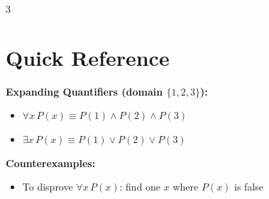 \documentclass[8pt]{article}
\begin{document}
\begin{multicols}{3}
\section*{Quick Reference}
\textbf{Expanding Quantifiers (domain $\{1,2,3\}$):}
\begin{itemize}[nosep]
\item $\forall x\, P(x) \equiv P(1) \land P(2) \land P(3)$
\item $\exists x\, P(x) \equiv P(1) \lor P(2) \lor P(3)$
\end{itemize}

\textbf{Counterexamples:}
\begin{itemize}[nosep]
\item To disprove $\forall x\, P(x)$: find one $x$ where $P(x)$ is false
\end{itemize}

\end{multicols}
\end{document}
